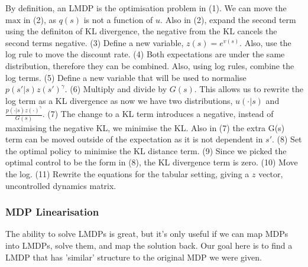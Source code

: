 By definition, an LMDP is the optimisation problem in (1). We can move the $\text{max}$ in (2), as $q(s)$ is not a function of $u$. Also in (2), expand the second term using the definiton of KL divergence, the negative from the KL cancels the second terms negative. (3) Define a new variable, $z(s) = e^{v(s)}$. Also, use the log rule to move the discount rate. (4) Both expectations are under the same distribution, therefore they can be combined. Also, using log rules, combine the log terms. (5) Define a new variable that will be used to normalise $p(s' | s)z(s')^{\gamma}$. (6) Multiply and divide by $G(s)$. This allows us to rewrite the log term as a KL divergence as now we have two distributions, $u(\cdot | s)$ and $\frac{p(\cdot | s)z(\cdot)^{\gamma}}{G(s)}$. (7) The change to a KL term introduces a negative, instead of maximising the negative KL, we minimise the KL. Also in (7) the extra G(s) term can be moved outside of the expectation as it is not dependent in $s'$. (8) Set the optimal policy to minimise the KL distance term. (9) Since we picked the optimal control to be the form in (8), the KL divergence term is zero. (10) Move the log. (11) Rewrite the equations for the tabular setting, giving a $z$ vector, uncontrolled dynamics matrix.

\subsubsection{MDP Linearisation}

The ability to solve LMDPs is great, but it's only useful if we can map MDPs into LMDPs, solve them, and map the solution back.
Our goal here is to find a LMDP that has 'similar' structure to the original MDP we were given. \footnotemark[2]



